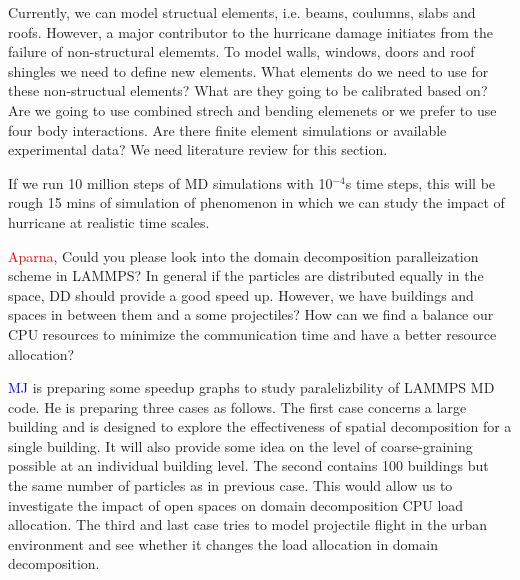 \documentclass{proposalnsf}
\begin{document}
\begin{description}[font=$\bullet$~\normalfont\scshape\color{red!50!black}]
\item [Development Four:] Currently, we can model structual elements, i.e. beams, coulumns, slabs and roofs. However, a major contributor to the hurricane damage initiates from the failure of non-structural elememts. To model walls, windows, doors and roof shingles we need to define new elements. What elements do we need to use for these non-structual elements? What are they going to be calibrated based on? Are we going to use combined strech and bending elemenets or we prefer to use four body interactions. Are there finite element simulations or available experimental data? We need literature review for this section.  

\end{description}

If we run 10 million steps of MD simulations with 10$^{-4}$s time steps, this will be rough 15 mins of simulation of phenomenon in which we can study the impact of hurricane at realistic time scales.   

\textcolor{red}{Aparna}, Could you please look into the domain decomposition paralleization scheme in LAMMPS? In general if the particles are distributed equally in the space, DD should provide a good speed up. However, we have buildings and spaces in between them and a some projectiles? How can we find a balance our CPU resources to minimize the communication time and have a better resource allocation?

\textcolor{blue}{MJ} is preparing some speedup graphs to study paralelizbility of LAMMPS MD code. He is preparing three cases as follows. The first case concerns a large building and is designed to explore the effectiveness of spatial decomposition for a single building. It will also provide some idea on the level of coarse-graining possible at an individual building level. The second contains 100 buildings but the same number of particles as in previous case. This would allow us to investigate the impact of open spaces on domain decomposition CPU load allocation. The third and last case tries to model projectile flight in the urban environment and see whether it changes the load allocation in domain decomposition. 
\end{document}
